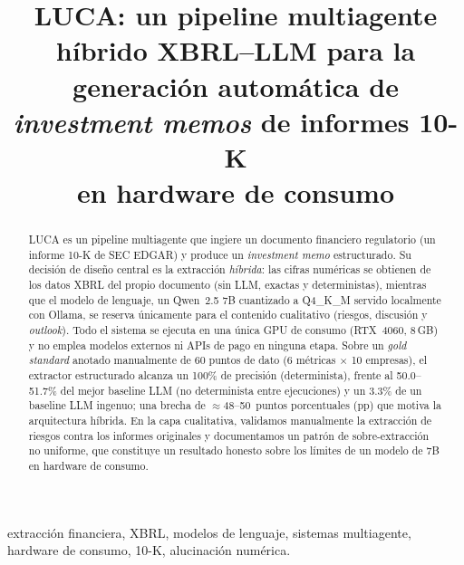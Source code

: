 \documentclass[conference]{IEEEtran}
\begin{document}
\title{LUCA: un pipeline multiagente híbrido XBRL--LLM para la\\
generación automática de \textit{investment memos} de informes 10-K\\
en hardware de consumo}

\author{
}

\maketitle

\begin{abstract}
LUCA es un pipeline multiagente que ingiere un documento financiero regulatorio
(un informe 10-K de SEC EDGAR) y produce un \textit{investment memo}
estructurado. Su decisión de diseño central es la extracción \emph{híbrida}: las
cifras numéricas se obtienen de los datos XBRL del propio documento (sin LLM,
exactas y deterministas), mientras que el modelo de lenguaje, un Qwen~2.5 7B
cuantizado a Q4\_K\_M servido localmente con Ollama, se reserva únicamente para
el contenido cualitativo (riesgos, discusión y \textit{outlook}). Todo el
sistema se ejecuta en una única GPU de consumo (RTX~4060, 8\,GB) y no emplea
modelos externos ni APIs de pago en ninguna etapa. Sobre un \textit{gold
standard} anotado manualmente de 60 puntos de dato (6 métricas $\times$ 10
empresas), el extractor estructurado alcanza un 100\% de precisión
(determinista), frente al 50.0--51.7\% del mejor baseline LLM (no determinista
entre ejecuciones) y un 3.3\% de un baseline LLM ingenuo; una brecha de
$\approx$48--50~puntos porcentuales (pp) que motiva la arquitectura híbrida. En
la capa cualitativa, validamos manualmente la extracción de riesgos contra los
informes originales y documentamos un patrón de sobre-extracción no uniforme,
que constituye un resultado honesto sobre los límites de un modelo de 7B en
hardware de consumo.
\end{abstract}

\begin{IEEEkeywords}
extracción financiera, XBRL, modelos de lenguaje, sistemas multiagente,
hardware de consumo, 10-K, alucinación numérica.
\end{IEEEkeywords}
\end{document}
